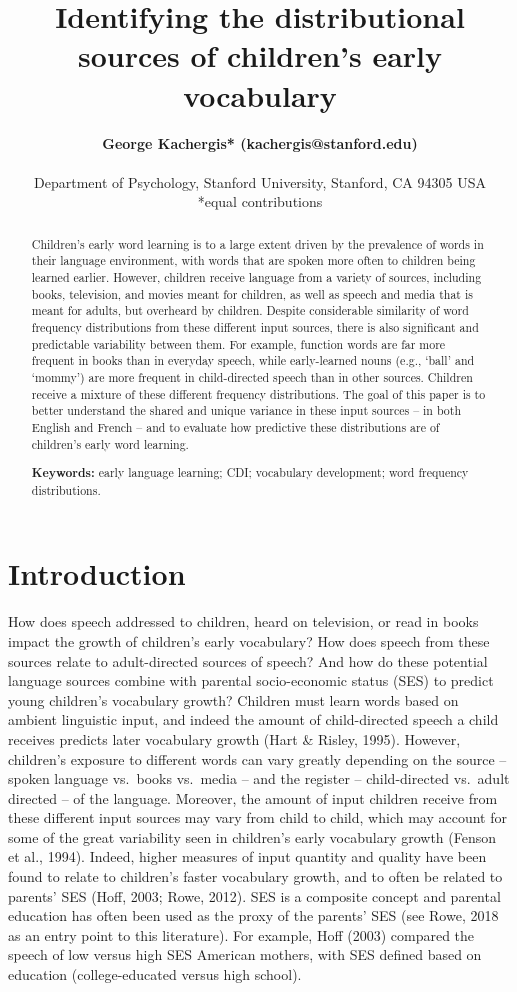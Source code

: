 \documentclass[10pt, letterpaper]{article}
\title{Identifying the distributional sources of children's early
vocabulary}
\author{{\large \bf George Kachergis* (kachergis@stanford.edu)} \AND {\large \bf Georgia Loukatou* (loukatou@stanford.edu)}  \AND {\large \bf Michael C. Frank (mcfrank@stanford.edu)} \\  \newline\\ Department of Psychology, Stanford University, Stanford, CA 94305 USA\\ *equal contributions}
\begin{document}
\maketitle

\begin{abstract}
Children's early word learning is to a large extent driven by the
prevalence of words in their language environment, with words that are
spoken more often to children being learned earlier. However, children
receive language from a variety of sources, including books, television,
and movies meant for children, as well as speech and media that is meant
for adults, but overheard by children. Despite considerable similarity
of word frequency distributions from these different input sources,
there is also significant and predictable variability between them. For
example, function words are far more frequent in books than in everyday
speech, while early-learned nouns (e.g., `ball' and `mommy') are more
frequent in child-directed speech than in other sources. Children
receive a mixture of these different frequency distributions. The goal
of this paper is to better understand the shared and unique variance in
these input sources -- in both English and French -- and to evaluate how
predictive these distributions are of children's early word learning.

\textbf{Keywords:}
early language learning; CDI; vocabulary development; word frequency
distributions.
\end{abstract}

\hypertarget{introduction}{%
\section{Introduction}\label{introduction}}

How does speech addressed to children, heard on television, or read in
books impact the growth of children's early vocabulary? How does speech
from these sources relate to adult-directed sources of speech? And how
do these potential language sources combine with parental socio-economic
status (SES) to predict young children's vocabulary growth? Children
must learn words based on ambient linguistic input, and indeed the
amount of child-directed speech a child receives predicts later
vocabulary growth (Hart \& Risley, 1995). However, children's exposure
to different words can vary greatly depending on the source -- spoken
language vs.~books vs.~media -- and the register -- child-directed
vs.~adult directed -- of the language. Moreover, the amount of input
children receive from these different input sources may vary from child
to child, which may account for some of the great variability seen in
children's early vocabulary growth (Fenson et al., 1994). Indeed, higher
measures of input quantity and quality have been found to relate to
children's faster vocabulary growth, and to often be related to parents'
SES (Hoff, 2003; Rowe, 2012). SES is a composite concept and parental
education has often been used as the proxy of the parents' SES (see
Rowe, 2018 as an entry point to this literature). For example, Hoff
(2003) compared the speech of low versus high SES American mothers, with
SES defined based on education (college-educated versus high school).
\end{document}
